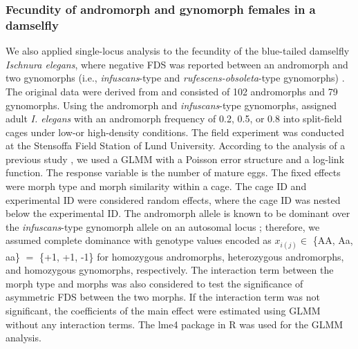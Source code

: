 \documentclass[12pt,]{article}
\begin{document}
\subsubsection{Fecundity of andromorph and gynomorph females in a damselfly}
We also applied single-locus analysis to the fecundity of the blue-tailed damselfly \textit{Ischnura elegans}, where negative FDS was reported between an andromorph and two gynomorphs (i.e., \textit{infuscans}-type and \textit{rufescens-obsoleta}-type gynomorphs) \citep{le2015evolutionary}. The original data were derived from \cite{takahashi2014evolution} and consisted of 102 andromorphs and 79 gynomorphs. Using the andromorph and \textit{infuscans}-type gynomorphs, \cite{takahashi2014evolution} assigned adult \textit{I. elegans} with an andromorph frequency of 0.2, 0.5, or 0.8 into split-field cages under low-or high-density conditions. The field experiment was conducted at the Stensoffa Field Station of Lund University. According to the analysis of a previous study \citep{takahashi2014evolution}, we used a GLMM with a Poisson error structure and a log-link function. The response variable is the number of mature eggs. The fixed effects were morph type and morph similarity within a cage. The cage ID and experimental ID were considered random effects, where the cage ID was nested below the experimental ID. The andromorph allele is known to be dominant over the \textit{infuscans}-type gynomorph allele on an autosomal locus \citep{sanchez2005hybridization}; therefore, we assumed complete dominance with genotype values encoded as $x_{i(j)} \in$ \{AA, Aa, aa\} $=$ \{+1, +1, -1\} for homozygous andromorphs, heterozygous andromorphs, and homozygous gynomorphs, respectively. The interaction term between the morph type and morphs was also considered to test the significance of asymmetric FDS between the two morphs. If the interaction term was not significant, the coefficients of the main effect were estimated using GLMM without any interaction terms. The lme4 package \citep{bates2015} in R was used for the GLMM analysis.
\end{document}
